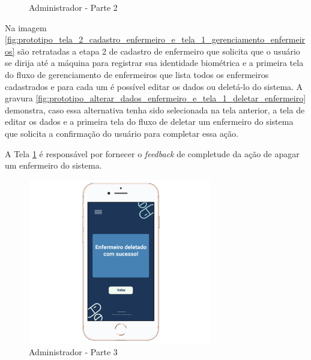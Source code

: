  \begin{figure}[H]
    \centering   
     \caption{Administrador - Parte 2}
\end{figure}

Na imagem \ref{fig:prototipo_tela_2_cadastro_enfermeiro_e_tela_1_gerenciamento_enfermeiros} são retratadas a etapa 2 de cadastro de enfermeiro que solicita que o usuário se dirija até a máquina para registrar sua identidade biométrica e a primeira tela do fluxo de gerenciamento de enfermeiros que lista todos os enfermeiros cadastrados e para cada um é possível editar os dados ou deletá-lo do sistema. A gravura \ref{fig:prototipo_alterar_dados_enfermeiro_e_tela_1_deletar_enfermeiro} demonstra, caso essa alternativa tenha sido selecionada na tela anterior, a tela de editar os dados e a primeira tela do fluxo de deletar um enfermeiro do sistema que solicita a confirmação do usuário para completar essa ação.

 A Tela \ref{fig:prototipo_tela_2_deletar_enfermeiro} é responsável por fornecer o \textit{feedback} de completude da ação de apagar um enfermeiro do sistema.
 
\begin{figure}[H]
    \centering
    \includegraphics[width=8cm]{figuras/Software_Prototipo/Prototipo_Fluxo_Administrador_5.png}
    \caption{Administrador - Parte 3}
    \label{fig:prototipo_tela_2_deletar_enfermeiro}
\end{figure}



